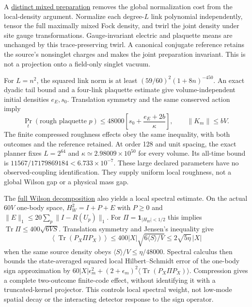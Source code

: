 A \href{https://github.com/FloatingPragma/observer-patch-holography/blob/main/model/particle_local_gauge_state/PROOF.md}{distinct mixed preparation}
removes the global normalization cost from the local-density argument.
Normalize each degree-$L$ link polynomial independently, tensor the full
maximally mixed Fock density, and twirl the joint density under site
gauge transformations. Gauge-invariant electric and plaquette means are
unchanged by this trace-preserving twirl. A canonical conjugate reference
retains the source's nonsinglet charges and makes the joint preparation
invariant. This is not a projection onto a field-only singlet vacuum.

For $L=n^2$, the squared link norm is at least
$(59/60)^2(1+8n)^{-450}$. An exact dyadic tail bound and a four-link
plaquette estimate give volume-independent initial densities $e_E,s_0$.
Translation symmetry and the same conserved action imply
\[
 \Pr_t(\text{rough plaquette }p)
 \le48000\left[s_0+\frac{e_E+2b}{\kappa}\right],
 \qquad \|K_m\|\le bV.
\]
The finite compressed roughness effects obey the same inequality, with
both outcomes and the reference retained. At order 128 and unit spacing,
the exact planner fixes $L=2^{64}$ and
$\kappa\simeq2.98009\times10^{50}$ for every volume. Its all-time
bound is $11567/17179869184<6.733\times10^{-7}$. These large declared
parameters have no observed-coupling identification. They supply uniform
local roughness, not a global Wilson gap or a physical mass gap.

The \href{https://github.com/FloatingPragma/observer-patch-holography/blob/main/model/particle_local_wilson_density/PROOF.md}{full Wilson decomposition}
also yields a local spectral estimate. On the actual $60V$ one-body
space, $H_W^2=I+P+E$ with $P\ge0$ and
$\|E\|_1\le20\sum_p\|I-R(U_p)\|_1$. For
$\Pi=\mathbf1_{|H_W|<1/2}$ this implies
$\operatorname{Tr}\Pi\le400\sqrt{6VS}$.
Translation symmetry and Jensen's inequality give
\[
 \left\langle\operatorname{Tr}(P_X\Pi P_X)\right\rangle
 \le400|X|\sqrt{6\langle S\rangle/V}
 \le2\sqrt{5\eta}\,|X|
\]
when the same source density obeys $\langle S\rangle/V\le\eta/48000$.
Spectral calculus then bounds the state-averaged squared local
Hilbert--Schmidt error of the one-body sign approximation by
$60|X|\epsilon_m^2+(2+\epsilon_m)^2
\langle\operatorname{Tr}(P_X\Pi P_X)\rangle$.
Compression gives a complete two-outcome
finite-code effect, without identifying it with a truncated-kernel
projector. This controls local spectral weight, not low-mode spatial
decay or the interacting detector response to the sign operator.

